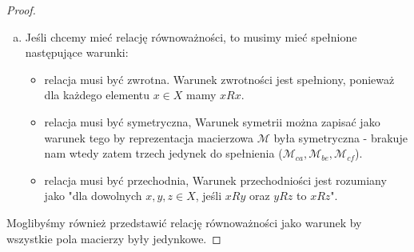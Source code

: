 \documentclass[11pt]{article}
\theoremstyle{definition}
\numberwithin{zadanie}{subsection}
\begin{document}
\begin{proof}
\begin{enumerate}[a)]
        \item Jeśli chcemy mieć relację równoważności, to musimy mieć spełnione następujące warunki:
              \begin{itemize}
                  \item relacja musi być zwrotna.
                        Warunek zwrotności jest spełniony, ponieważ dla każdego elementu $x\in X$ mamy $xRx$.
                  \item relacja musi być symetryczna,
                        Warunek symetrii można zapisać jako warunek tego by reprezentacja macierzowa $\mathcal M$ była symetryczna - brakuje nam wtedy zatem trzech jedynek do spełnienia ($\mathcal M_{ca}, \mathcal M_{be}, \mathcal M_{cf}$).
                  \item relacja musi być przechodnia,
                        Warunek przechodniości jest rozumiany jako "dla dowolnych $x,y,z\in X$, jeśli $x R y$ oraz $y R z$ to $x R z$".
              \end{itemize}
    \end{enumerate}

    Moglibyśmy również przedstawić relację równoważności jako warunek by wszystkie pola macierzy były jedynkowe.
\end{proof}
\end{document}
